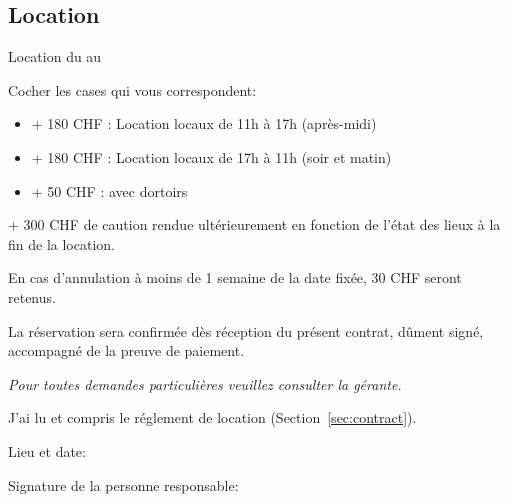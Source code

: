 \documentclass[a4paper,12pt]{extarticle}
\begin{document}
\subsection*{Location}

Location du  au 

Cocher les cases qui vous correspondent:

\begin{itemize}
    \item[]  + 180 CHF : Location locaux de 11h à 17h (après-midi)
    \item[]  + 180 CHF : Location locaux de 17h à 11h (soir et matin)
    \item[]  + 50 CHF : avec dortoirs
\end{itemize}

+ 300 CHF de caution rendue ultérieurement en fonction de l'état des lieux à la fin de la location.

En cas d'annulation à moins de 1 semaine de la date fixée, 30 CHF seront retenus.

La réservation sera confirmée dès réception du présent contrat, dûment signé, accompagné de la preuve de paiement.

\textit{Pour toutes demandes particulières veuillez consulter la gérante.}

 J'ai lu et compris le réglement de location (Section~\ref{sec:contract}).


Lieu et date: 

Signature de la personne responsable: \hrulefill
\end{document}
